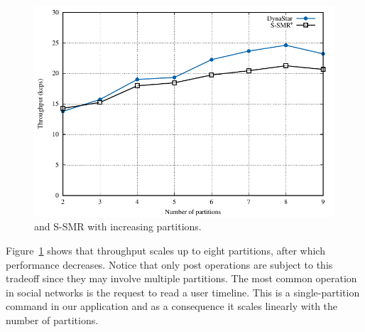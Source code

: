 \begin{figure}[ht]
	\includegraphics[width=0.95\columnwidth]{figures/experiments/social-network-ideal-partition/social-network-ideal-partition}
	\caption{\dynastar and S-SMR with increasing partitions.}
	\label{fig:4p1p_varying_partition_size}
\end{figure}

Figure~\ref{fig:4p1p_varying_partition_size} shows that \dynastar throughput scales up to eight partitions, after which performance decreases.
Notice that only post operations are subject to this tradeoff since they may involve multiple partitions.
The most common operation in social networks is the request to read a user timeline. This is a single-partition
command in our application and as a consequence it scales linearly with the number of partitions.


